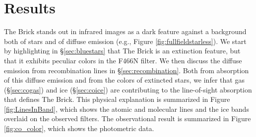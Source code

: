 \documentclass[times,astrosymb,twocolumn]{aastex631}
\def\rr#1{#1}
\begin{document}
\section{Results}
\label{sec:results}
The Brick stands out in infrared images as a dark feature against a background both of stars and of diffuse emission (e.g., Figure \ref{fig:fullfieldstarless}). %
We start by highlighting \rr{in \S \ref{sec:bluestars}} that The Brick is an extinction feature, but that it exhibits peculiar colors in the F466N filter.
We then discuss the diffuse emission from recombination lines in \S \ref{sec:recombination}.
Both from absorption of this diffuse emission and from the colors of extincted stars, we infer that gas (\S \ref{sec:cogas}) and ice (\S \ref{sec:coice}) are contributing to the line-of-sight absorption that defines The Brick.
\rr{This physical explanation is summarized in Figure \ref{fig:LinesInBand}, which shows the atomic and molecular lines and the ice bands overlaid on the observed filters.
The observational result is summarized in Figure \ref{fig:co_color}, which shows the photometric data.}

\end{document}
